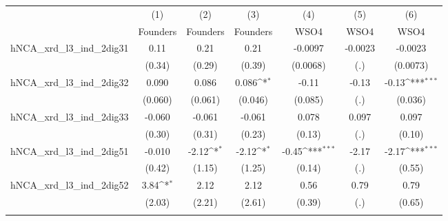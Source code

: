 {
\def\sym#1{\ifmmode^{#1}\else\(^{#1}\)\fi}
\begin{tabular}{l*{6}{c}}
\toprule
                    &\multicolumn{1}{c}{(1)}&\multicolumn{1}{c}{(2)}&\multicolumn{1}{c}{(3)}&\multicolumn{1}{c}{(4)}&\multicolumn{1}{c}{(5)}&\multicolumn{1}{c}{(6)}\\
                    &\multicolumn{1}{c}{Founders}&\multicolumn{1}{c}{Founders}&\multicolumn{1}{c}{Founders}&\multicolumn{1}{c}{WSO4}&\multicolumn{1}{c}{WSO4}&\multicolumn{1}{c}{WSO4}\\
\midrule
hNCA\_xrd\_l3\_ind\_2dig31&        0.11         &        0.21         &        0.21         &     -0.0097         &     -0.0023         &     -0.0023         \\
                    &      (0.34)         &      (0.29)         &      (0.39)         &    (0.0068)         &         (.)         &    (0.0073)         \\
\addlinespace
hNCA\_xrd\_l3\_ind\_2dig32&       0.090         &       0.086         &       0.086\sym{*}  &       -0.11         &       -0.13         &       -0.13\sym{***}\\
                    &     (0.060)         &     (0.061)         &     (0.046)         &     (0.085)         &         (.)         &     (0.036)         \\
\addlinespace
hNCA\_xrd\_l3\_ind\_2dig33&      -0.060         &      -0.061         &      -0.061         &       0.078         &       0.097         &       0.097         \\
                    &      (0.30)         &      (0.31)         &      (0.23)         &      (0.13)         &         (.)         &      (0.10)         \\
\addlinespace
hNCA\_xrd\_l3\_ind\_2dig51&      -0.010         &       -2.12\sym{*}  &       -2.12\sym{*}  &       -0.45\sym{***}&       -2.17         &       -2.17\sym{***}\\
                    &      (0.42)         &      (1.15)         &      (1.25)         &      (0.14)         &         (.)         &      (0.55)         \\
\addlinespace
hNCA\_xrd\_l3\_ind\_2dig52&        3.84\sym{*}  &        2.12         &        2.12         &        0.56         &        0.79         &        0.79         \\
                    &      (2.03)         &      (2.21)         &      (2.61)         &      (0.39)         &         (.)         &      (0.65)         \\
\addlinespace

\end{tabular}}
